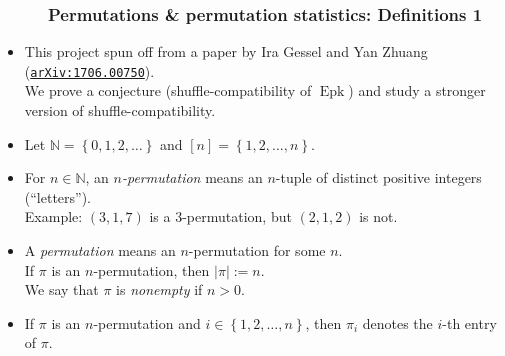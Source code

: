 \documentclass{beamer}
\newcommand{\red}{\color{red}}
\newcommand{\NN}{{\mathbb N}}
\newcommand{\Epk}{\operatorname{Epk}}
\newcommand\arxiv[1]{\href{http://www.arxiv.org/abs/#1}{\texttt{arXiv:#1}}}
\newcommand{\fti}[1]{\frametitle{\ \ \ \ \ #1}}
\newcommand{\set}[1]{\left\{ #1 \right\}}
\newcommand{\abs}[1]{\left| #1 \right|}
\newcommand{\tup}[1]{\left( #1 \right)}
\newcommand{\ive}[1]{\left[ #1 \right]}
\newcommand{\defn}[1]{{\color{darkred}\emph{#1}}} %
\theoremstyle{plain}
\begin{document}
\begin{frame}
\fti{Permutations \& permutation statistics: Definitions 1}

\begin{itemize}

\item This project spun off from a paper by Ira Gessel and Yan Zhuang
({\red \arxiv{1706.00750}}). \\
We prove a conjecture (shuffle-compatibility of $\Epk$)
and study a stronger version of shuffle-compatibility.

\pause

\item Let $\NN = \set{0, 1, 2, \ldots}$ and $\ive{n} = \set{1, 2, \ldots, n}$.

\item For $n \in \NN$, an \defn{$n$-permutation} means an $n$-tuple of
        distinct positive integers (``letters''). \\
        Example: $\tup{3, 1, 7}$ is a $3$-permutation, but
                 $\tup{2, 1, 2}$ is not.

\pause

\item A \defn{permutation} means an $n$-permutation for some $n$. \\ \pause
      If $\pi$ is an $n$-permutation, then \defn{$\abs{\pi} := n$}. \\ \pause
      We say that $\pi$ is \defn{nonempty} if $n > 0$.

\pause

\item If $\pi$ is an $n$-permutation and $i \in \set{1, 2, \ldots, n}$,
      then \defn{$\pi_i$} denotes the $i$-th entry of $\pi$.

\end{itemize}
\end{frame}
\end{document}
